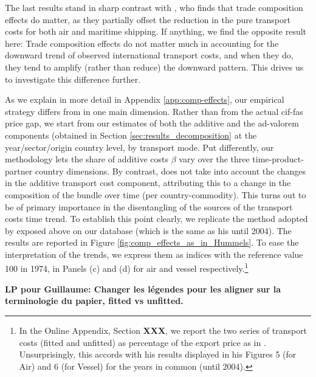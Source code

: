 \documentclass[a4paper,11pt]{article}
\begin{document}
The last results stand in sharp contrast with \cite{hummels2007}, who finds that trade composition effects do matter, as they partially offset the reduction in the pure transport costs for both air and maritime shipping. If anything, we find the opposite result here: Trade composition effects do not matter much in accounting for the downward trend of observed international transport costs, and when they do, they tend to amplify (rather than reduce) the downward pattern. This drives us to investigate this difference further.

As we explain in more detail in Appendix \ref{app:comp-effects}, our empirical strategy differs from \cite{hummels2007} in one main dimension.
Rather than from the actual cif-fas price gap, we start from our estimates of both the additive and the ad-valorem components (obtained in Section \ref{sec:results_decomposition} at the year/sector/origin country level, by transport mode. Put differently, our methodology lets the share of additive costs $\beta$ vary over the three time-product-partner country dimensions. By contrast, \cite{hummels2007} does not take into account the changes in the additive transport cost component, attributing this to a change in the composition of the bundle over time (per country-commodity). This turns out to be of primary importance in the disentangling of the sources of the transport costs time trend. To establish this point clearly, we replicate the method adopted by \cite{hummels2007} exposed above on our database (which is the same as his until 2004). The results are reported in Figure \ref{fig:comp_effects_as_in_Hummels}. To ease the interpretation of the trends, we express them as indices with the reference value 100 in 1974, in Panels (c) and (d) for air and vessel respectively.\footnote{In the Online Appendix, Section \textbf{XXX}, we report the two series of transport costs (fitted and unfitted) as percentage of the export price as in \cite{hummels2007}. Unsurprisingly, this accords with his results displayed in his Figures 5 (for Air) and 6 (for Vessel) for the years in common (until 2004). }

\textbf{LP pour Guillaume: Changer les légendes pour les aligner sur la terminologie du papier, fitted vs unfitted.}
\end{document}
